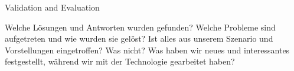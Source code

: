 Validation and Evaluation

Welche Lösungen und Antworten wurden gefunden?
Welche Probleme sind aufgetreten und wie wurden sie gelöst?
Ist alles aus unserem Szenario und Vorstellungen eingetroffen? Was nicht?
Was haben wir neues und interessantes festgestellt, während wir mit der Technologie gearbeitet haben?

